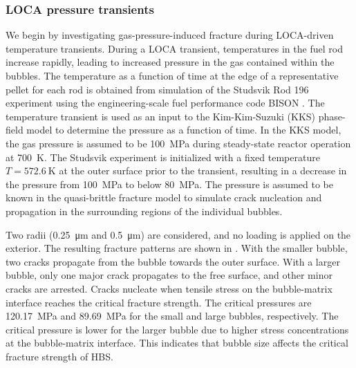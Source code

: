\subsubsection{LOCA pressure transients}

We begin by investigating gas-pressure-induced fracture during LOCA-driven temperature transients. During a LOCA transient, temperatures in the fuel rod increase rapidly, leading to increased pressure in the gas contained within the bubbles. The temperature as a function of time at the edge of a representative pellet for each rod is obtained from simulation of the Studsvik Rod 196 experiment \cite{STUDSVIK} using the engineering-scale fuel performance code BISON \cite{WILLIAMSON2020}. The temperature transient is used as an input to the Kim-Kim-Suzuki (KKS) phase-field model \cite{Aagesen2020} to determine the pressure as a function of time. In the KKS model, the gas pressure is assumed to be \SI{100}{\mega\pascal} during steady-state reactor operation at \SI{700}{\kelvin}. The Studsvik experiment is initialized with a fixed temperature $T = \SI{572.6}{\kelvin}$ at the outer surface prior to the transient, resulting in a decrease in the pressure from \SI{100}{\mega\pascal} to below \SI{80}{\mega\pascal}. The pressure is assumed to be known in the quasi-brittle fracture model to simulate crack nucleation and propagation in the surrounding regions of the individual bubbles.

Two radii (\SI{0.25}{\micro\meter} and \SI{0.5}{\micro\meter}) are considered, and no loading is applied on the exterior. The resulting fracture patterns are shown in . With the smaller bubble, two cracks propagate from the bubble towards the outer surface. With a larger bubble, only one major crack propagates to the free surface, and other minor cracks are arrested. Cracks nucleate when tensile stress on the bubble-matrix interface reaches the critical fracture strength. The critical pressures are \SI{120.17}{\mega\pascal} and \SI{89.69}{\mega\pascal} for the small and large bubbles, respectively. The critical pressure is lower for the larger bubble due to higher stress concentrations at the bubble-matrix interface. This indicates that bubble size affects the critical fracture strength of HBS.

